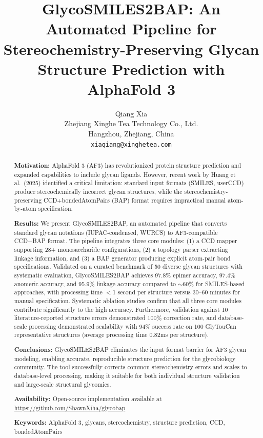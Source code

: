 \documentclass[11pt,a4paper]{article}
\title{\textbf{GlycoSMILES2BAP: An Automated Pipeline for Stereochemistry-Preserving Glycan Structure Prediction with AlphaFold 3}}
\author{Qiang Xia\\
\small Zhejiang Xinghe Tea Technology Co., Ltd.\\
\small Hangzhou, Zhejiang, China\\
\small \texttt{xiaqiang@xinghetea.com}}
\date{}
\begin{document}
\maketitle

\begin{abstract}

\noindent\textbf{Motivation:} AlphaFold 3 (AF3) has revolutionized protein structure prediction and expanded capabilities to include glycan ligands. However, recent work by Huang et al.\ (2025) identified a critical limitation: standard input formats (SMILES, userCCD) produce stereochemically incorrect glycan structures, while the stereochemistry-preserving CCD+bondedAtomPairs (BAP) format requires impractical manual atom-by-atom specification.

\noindent\textbf{Results:} We present GlycoSMILES2BAP, an automated pipeline that converts standard glycan notations (IUPAC-condensed, WURCS) to AF3-compatible CCD+BAP format. The pipeline integrates three core modules: (1) a CCD mapper supporting 28+ monosaccharide configurations, (2) a topology parser extracting linkage information, and (3) a BAP generator producing explicit atom-pair bond specifications. Validated on a curated benchmark of 50 diverse glycan structures with systematic evaluation, GlycoSMILES2BAP achieves 97.8\% epimer accuracy, 97.4\% anomeric accuracy, and 95.9\% linkage accuracy compared to $\sim$60\% for SMILES-based approaches, with processing time $<$1 second per structure versus 30--60 minutes for manual specification. Systematic ablation studies confirm that all three core modules contribute significantly to the high accuracy. Furthermore, validation against 10 literature-reported structure errors demonstrated 100\% correction rate, and database-scale processing demonstrated scalability with 94\% success rate on 100 GlyTouCan representative structures (average processing time 0.82ms per structure).

\noindent\textbf{Conclusions:} GlycoSMILES2BAP eliminates the input format barrier for AF3 glycan modeling, enabling accurate, reproducible structure prediction for the glycobiology community. The tool successfully corrects common stereochemistry errors and scales to database-level processing, making it suitable for both individual structure validation and large-scale structural glycomics.

\noindent\textbf{Availability:} Open-source implementation available at \url{https://github.com/ShawnXiha/glycobap}

\noindent\textbf{Keywords:} AlphaFold 3, glycans, stereochemistry, structure prediction, CCD, bondedAtomPairs

\end{abstract}
\end{document}

